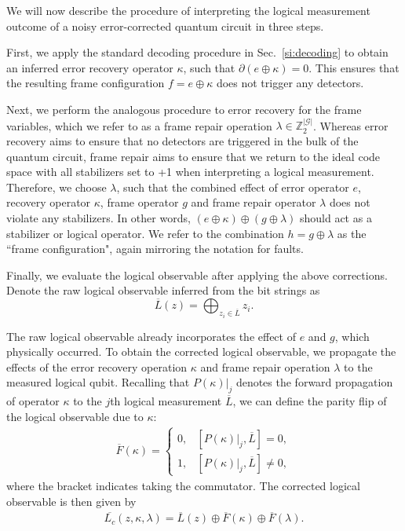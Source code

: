 We will now describe the procedure of interpreting the logical measurement outcome of a noisy error-corrected quantum circuit in three steps.

First, we apply the standard decoding procedure in Sec.~\ref{si:decoding} to obtain an inferred error recovery operator $\kappa$, such that $\partial(e\oplus\kappa)=0$.
%
This ensures that the resulting frame configuration $f=e\oplus\kappa$ does not trigger any detectors.

Next, we perform the analogous procedure to error recovery for the frame variables, which we refer to as a frame repair operation $\lambda\in\mathbb{Z}_2^{|\mathcal{G}|}$.
%
Whereas error recovery aims to ensure that no detectors are triggered in the bulk of the quantum circuit, frame repair aims to ensure that we return to the ideal code space with all stabilizers set to +1 when interpreting a logical measurement.
%
Therefore, we choose $\lambda$, such that the combined effect of error operator $e$, recovery operator $\kappa$, frame operator $g$ and frame repair operator $\lambda$ does not violate any stabilizers.
%
In other words, $(e\oplus\kappa)\oplus(g\oplus\lambda)$ should act as a stabilizer or logical operator.
%
We refer to the combination $h=g\oplus\lambda$ as the ``frame configuration", again mirroring the notation for faults.

Finally, we evaluate the logical observable after applying the above corrections.
%
Denote the raw logical observable inferred from the bit strings as $$\overline{L}(z)=\bigoplus_{z_i\in \overline{L}} z_i.$$

The raw logical observable already incorporates the effect of $e$ and $g$, which physically occurred.
%
To obtain the corrected logical observable, we propagate the effects of the error recovery operation $\kappa$ and frame repair operation $\lambda$ to the measured logical qubit.
%
Recalling that $P(\kappa)|_j$ denotes the forward propagation of operator $\kappa$ to the $j$th logical measurement $\overline{L}$, we can define the parity flip of the logical observable due to $\kappa$:
\begin{align}
\overline{F}(\kappa)=
\begin{cases}
0, & \left[P(\kappa)|_j, \overline{L}\right]=0,\\
1, & \left[P(\kappa)|_j, \overline{L}\right]\neq 0,
\end{cases}
\end{align}
where the bracket indicates taking the commutator.
%
The corrected logical observable is then given by
\begin{align}
\overline{L_c}(z,\kappa,\lambda)=\overline{L}(z)\oplus \overline{F}(\kappa)\oplus \overline{F}(\lambda).
\end{align}

